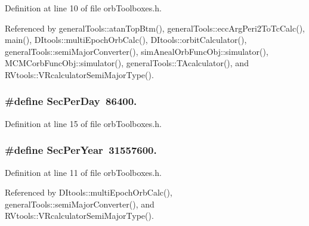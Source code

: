 Definition at line 10 of file orb\-Toolboxes.\-h.



Referenced by general\-Tools\-::atan\-Top\-Btm(), general\-Tools\-::ecc\-Arg\-Peri2\-To\-Tc\-Calc(), main(), D\-Itools\-::multi\-Epoch\-Orb\-Calc(), D\-Itools\-::orbit\-Calculator(), general\-Tools\-::semi\-Major\-Converter(), sim\-Aneal\-Orb\-Func\-Obj\-::simulator(), M\-C\-M\-Corb\-Func\-Obj\-::simulator(), general\-Tools\-::\-T\-Acalculator(), and R\-Vtools\-::\-V\-Rcalculator\-Semi\-Major\-Type().

\subsubsection[{Sec\-Per\-Day}]{\setlength{\rightskip}{0pt plus 5cm}\#define Sec\-Per\-Day~86400.}\label{orb_toolboxes_8h_a7418946957d43f7beeb2ba6055489d8b}


Definition at line 15 of file orb\-Toolboxes.\-h.

\subsubsection[{Sec\-Per\-Year}]{\setlength{\rightskip}{0pt plus 5cm}\#define Sec\-Per\-Year~31557600.}\label{orb_toolboxes_8h_a6d6e19125fe7f31962a34db2a378113d}


Definition at line 11 of file orb\-Toolboxes.\-h.



Referenced by D\-Itools\-::multi\-Epoch\-Orb\-Calc(), general\-Tools\-::semi\-Major\-Converter(), and R\-Vtools\-::\-V\-Rcalculator\-Semi\-Major\-Type().

